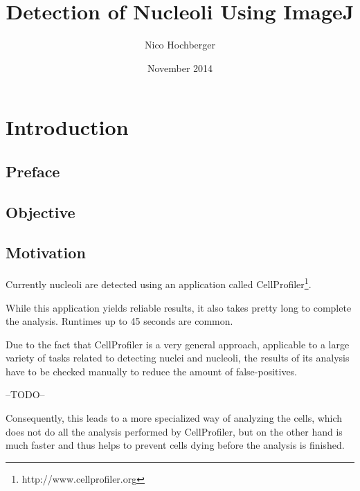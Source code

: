 \documentclass[a4paper, 11pt]{article}
\begin{document}


\title{Detection of Nucleoli Using ImageJ}
\author{Nico Hochberger}
\date{November 2014}
\maketitle

\newpage
\tableofcontents
 
\newpage
\listoffigures

\newpage
\listoftables

\newpage
\section{Introduction}

\subsection{Preface}
 
\subsection{Objective}

\subsection{Motivation}
Currently nucleoli are detected using an application called
CellProfiler\footnote{http://www.cellprofiler.org}.

While this application yields reliable results, it also takes pretty long to complete
the analysis. Runtimes up to 45 seconds are common.

Due to the fact that CellProfiler is a very general approach, applicable to a
large variety of tasks related to detecting nuclei and nucleoli, the results of
its analysis have to be checked manually to reduce the amount of
false-positives.

--TODO--

Consequently, this leads to a more specialized way of analyzing the cells, which
does not do all the analysis performed by CellProfiler, but on the other hand is
much faster and thus helps to prevent cells dying before the analysis is
finished.
\end{document}
